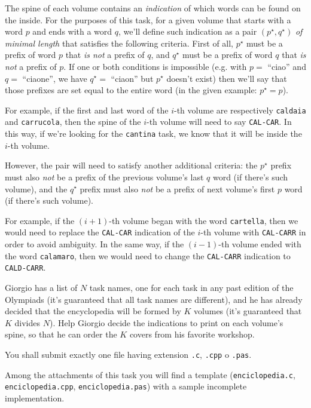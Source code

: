 The spine of each volume contains an \emph{indication} of which words can be found on the inside. For the purposes of this task, for a given volume that starts with a word $p$ and ends with a word $q$, we'll define such indication as a pair $(p^\star, q^\star)$ \emph{of minimal length} that satisfies the following criteria. First of all, $p^\star$ must be a prefix of word $p$ that \emph{is not} a prefix of $q$, and $q^\star$ must be a prefix of word $q$ that \emph{is not} a prefix of $p$. If one or both conditions is impossible (e.g. with $p = $ ``ciao'' and $q = $ ``ciaone'', we have $q^\star = $ ``ciaon'' but $p^\star$ doesn't exist) then we'll say that those prefixes are set equal to the entire word (in the given example: $p^\star = p$).

For example, if the first and last word of the $i$-th volume are respectively \texttt{caldaia} and \texttt{carrucola}, then the spine of the $i$-th volume will need to say \texttt{CAL-CAR}. In this way, if we're looking for the \texttt{cantina} task, we know that it will be inside the $i$-th volume.

\pagebreak

However, the pair will need to satisfy another additional criteria: the $p^\star$ prefix must also \emph{not} be a prefix of the previous volume's last $q$ word (if there's such volume), and the $q^\star$ prefix must also \emph{not} be a prefix of next volume's first $p$ word (if there's such volume).

For example, if the $(i+1)$-th volume began with the word \texttt{cartella}, then we would need to replace the \texttt{CAL-CAR} indication of the $i$-th volume with \texttt{CAL-CARR} in order to avoid ambiguity. In the same way, if the $(i-1)$-th volume ended with the word \texttt{calamaro}, then we would need to change the \texttt{CAL-CARR} indication to \texttt{CALD-CARR}.

Giorgio has a list of $N$ task names, one for each task in any past edition of the Olympiads (it's guaranteed that all task names are different), and he has already decided that the encyclopedia will be formed by $K$ volumes (it's guaranteed that $K$ divides $N$). Help Giorgio decide the indications to print on each volume's spine, so that he can order the $K$ covers from his favorite workshop.

\Implementation
You shall submit exactly one file having extension \texttt{.c}, \texttt{.cpp} o \texttt{.pas}.

\begin{warning}
Among the attachments of this task you will find a template (\texttt{enciclopedia.c}, \texttt{enciclopedia.cpp}, \texttt{enciclopedia.pas}) with a sample incomplete implementation.
\end{warning}

